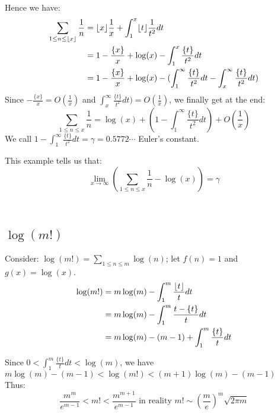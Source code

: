 \documentclass{article}
\DeclarePairedDelimiter\floor{\lfloor}{\rfloor}
\theoremstyle{definition}
\theoremstyle{remark}
\theoremstyle{definition}
\begin{document}
	Hence we have:\begin{align*}
		\sum_{1\leq n\leq \floor*{x}} \frac{1}{n} &= \floor{x}\frac{1}{x} + \int_{1}^x \floor{t}\frac{1}{t^2}dt\\
		&= 1 - \frac{\{x\}}{x} + \log(x) - \int_{1}^x\frac{\{t\}}{t^2}dt\\
		&= 1 - \frac{\{x\}}{x} + \log(x) - (\int_{1}^\infty\frac{\{t\}}{t^2}dt- \int_{x}^\infty\frac{\{t\}}{t^2}dt)\\
	\end{align*}
	Since $- \frac{\{x\}}{x} = O(\frac{1}{x})$ and $\int_{x}^\infty\frac{\{t\}}{t^2}dt) = O(\frac{1}{x})$, we finally get at the end:\begin{equation*}
		\sum_{1\leq n\leq x}\frac{1}{n} = \log(x) + (1 - \int_{1}^\infty\frac{\{t\}}{t^2}dt) + O(\frac{1}{x})
	\end{equation*}
	We call $1 - \int_{1}^\infty\frac{\{t\}}{t^2}dt = \gamma = 0.5772\cdots$ Euler's constant.


This example tells us that: $$\lim_{x\rightarrow\infty} (\sum_{1\leq n\leq x}\frac{1}{n} - \log(x)) = \gamma$$

\

\subsection{$\log(m!)$}
Consider: $\log(m!) = \sum_{1\leq n\leq m}\log(n)$; let $f(n) = 1$ and $g(x) = \log(x)$.\begin{align*}
	\log(m!) &= m\log(m) - \int_{1}^m \frac{\floor{t}}{t}dt\\
	&= m\log(m) - \int_{1}^m \frac{t-\{t\}}{t}dt\\
	&= m\log(m) - (m-1) + \int_{1}^m \frac{\{t\}}{t}dt\\
\end{align*}

Since $0 < \int_{1}^m \frac{\{t\}}{t}dt <\log(m)$, we have $m\log(m) - (m-1) < \log(m!) < (m+1)\log(m) - (m-1)$\\
Thus: $$\frac{m^m}{e^{m-1}}< m! <\frac{m^{m+1}}{e^{m-1}} \text{ in reality }m!\sim (\frac{m}{e})^m\sqrt{2\pi m}$$
\end{document}
